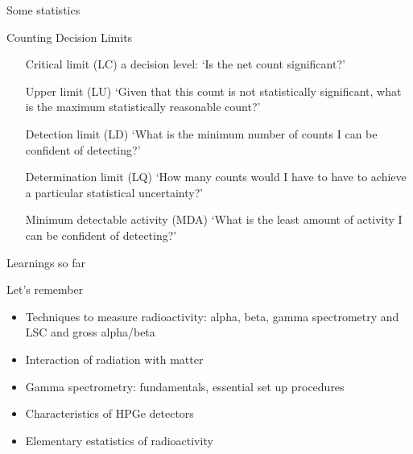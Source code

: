 \begin{frame}{Some statistics}

\alert{Counting Decision Limits}

\begin{flushright}

\begin{minipage}{0.6\textwidth}
{\scriptsize 
\begin{itemize}
\item[Critical limit (LC)] a decision level: ‘Is the net count significant?’
\item[Upper limit (LU)] ‘Given that this count is not statistically significant, what is the maximum statistically reasonable count?’
\item[Detection limit (LD)] ‘What is the minimum number of counts I can be confident of detecting?’
\item[Determination limit (LQ)] ‘How many counts would I have to have to achieve a particular statistical uncertainty?’
\item[Minimum detectable activity (MDA)] ‘What is the least amount of activity I can be confident of detecting?’
\end{itemize}
}
\end{minipage}
\end{flushright}

\end{frame}

\begin{frame}{Learnings so far}

\begin{alertblock}{Let's remember}

\begin{itemize}

\pause \item Techniques to measure radioactivity: alpha, beta, gamma spectrometry and LSC and gross alpha/beta

\pause \item Interaction of radiation with matter

\pause \item Gamma spectrometry: fundamentals, essential set up procedures

\pause \item Characteristics of HPGe detectors

\pause \item Elementary estatistics of radioactivity


\end{itemize}

\end{alertblock}

\end{frame}